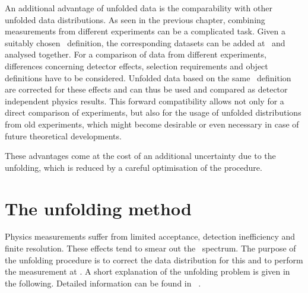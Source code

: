 An additional advantage of unfolded data is the comparability with other unfolded data distributions. 
As seen in the previous chapter, combining measurements from different experiments can be a complicated task. Given a suitably chosen \truelevel\ definition, the corresponding datasets can be added at \truelevel\ and analysed together.
For a comparison of data from different experiments, differences concerning detector effects, selection requirements and object definitions have to be considered. Unfolded data based on the same \truelevel\ definition are corrected for these effects and can thus be used and compared as detector independent physics results. 
This forward compatibility allows not only for a direct comparison of experiments, but also for the usage of unfolded distributions from old experiments, which might become desirable or even necessary in case of future theoretical developments. 


These advantages come at the cost of an additional uncertainty due to the unfolding, which is reduced by a careful optimisation of the procedure.









\section{The unfolding method}
%
Physics measurements suffer from limited acceptance, detection inefficiency and finite resolution. These effects tend to smear out the \truelevel\ spectrum. The purpose of the unfolding procedure is to correct the data distribution for this and to perform the measurement at \stablevel. A short explanation of the unfolding problem is given in the following. Detailed information can be found in ~\cite{Blobel:1984ku,CowanBook}.


